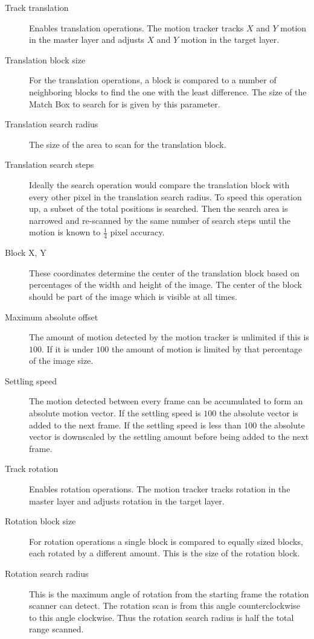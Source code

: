 \begin{description}
    \item[Track translation] Enables translation operations. The motion tracker tracks $X$ and $Y$ motion in the master layer and adjusts $X$ and $Y$ motion in the target layer.
    
    \item[Translation block size] For the translation operations, a block is compared to a number of neighboring blocks to find the one with the least difference. The size of the Match Box to search for is given by this parameter.
    \item[Translation search radius] The size of the area to scan for the translation block.
    \item[Translation search steps] Ideally the search operation would compare the translation block with every other pixel in the translation search radius. To speed this operation up, a subset of the total positions is searched. Then the search area is narrowed and re-scanned by the same number of search steps until the motion is known to $\frac{1}{4}$ pixel accuracy.
    \item[Block X, Y] These coordinates determine the center of the translation block based on percentages of the width and height of the image. The center of the block should be part of the image which is visible at all times.
    \item[Maximum absolute offset] The amount of motion detected by the motion tracker is unlimited if this is $100$. If it is under $100$ the amount of motion is limited by that percentage of the image size.
    \item[Settling speed] The motion detected between every frame can be accumulated to form an absolute motion vector. If the settling speed is $100$ the absolute vector is added to the next frame. If the settling speed is less than $100$ the absolute vector is downscaled by the settling amount before being added to the next frame.
    \item[Track rotation] Enables rotation operations. The motion tracker tracks rotation in the master layer and adjusts rotation in the target layer.
    \item[Rotation block size] For rotation operations a single block is compared to equally sized blocks, each rotated by a different amount. This is the size of the rotation block.
    \item[Rotation search radius] This is the maximum angle of rotation from the starting frame the rotation scanner can detect. The rotation scan is from this angle counterclockwise to this angle clockwise. Thus the rotation search radius is half the total range scanned.

\end{description}

